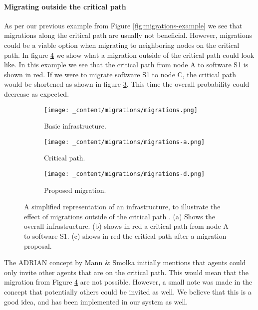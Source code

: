 \paragraph*{Migrating outside the critical path}
As per our previous example from Figure \ref{fig:migrations-example} we see that migrations along the critical path are usually not beneficial. However, migrations could be a viable option when migrating to neighboring nodes on the critical path. In figure \ref{fig:migrations-outside} we show what a migration outside of the critical path could look like. In this example we see that the critical path from node A to software S1 is shown in red. If we were to migrate software S1 to node C, the critical path would be shortened as shown in figure \ref{fig:migrations-outside-proposal}. This time the overall probability could decrease as expected.  

\begin{figure}[H]
    \begin{subfigure}[b]{0.3\textwidth}
        \centering
        \texttt{[image: \_content/migrations/migrations.png]}
        \caption{Basic infrastructure.}
        \label{fig:migrations-outside-infrastructure}
    \end{subfigure}
    \begin{subfigure}[b]{0.3\textwidth}
        \centering
        \texttt{[image: \_content/migrations/migrations-a.png]}
        \caption{Critical path.}
        \label{fig:migrations-outside-attack}
    \end{subfigure}
    \begin{subfigure}[b]{0.3\textwidth}
        \centering
        \texttt{[image: \_content/migrations/migrations-d.png]}
        \caption{Proposed migration.}
        \label{fig:migrations-outside-proposal}
    \end{subfigure}
    \caption{A simplified representation of an infrastructure, to illustrate the effect of migrations outside of the critical path . (a) Shows the overall infrastructure. (b) shows in red a critical path from node A to software S1. (c) shows in red the critical path after a migration proposal.}
    \label{fig:migrations-outside}
\end{figure}

The ADRIAN concept by Mann \& Smolka \cite{mann2023ADRIAN} initially mentions that agents could only invite other agents that are on the critical path. This would mean that the migration from Figure \ref{fig:migrations-outside} are not possible. However, a small note was made in the concept that potentially others could be invited as well. We believe that this is a good idea, and has been implemented in our system as well.

